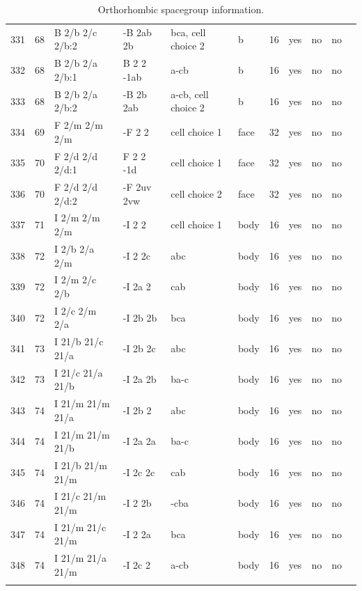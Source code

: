 \begin{center}
\begin{small}
\begin{longtable}{|l|l|l|l|l|l|l|l|l|l|l|}
331 &68 &B 2/b 2/c 2/b:2 &-B 2ab 2b &bca, cell choice 2 &b &16 &yes &no &no \\ 
332 &68 &B 2/b 2/a 2/b:1 &B 2 2 -1ab &a-cb &b &16 &yes &no &no \\ 
333 &68 &B 2/b 2/a 2/b:2 &-B 2b 2ab &a-cb, cell choice 2 &b &16 &yes &no &no \\ 
334 &69 &F 2/m 2/m 2/m &-F 2 2 &cell choice 1 &face &32 &yes &no &no \\ 
335 &70 &F 2/d 2/d 2/d:1 &F 2 2 -1d &cell choice 1 &face &32 &yes &no &no \\ 
336 &70 &F 2/d 2/d 2/d:2 &-F 2uv 2vw &cell choice 2 &face &32 &yes &no &no \\ 
337 &71 &I 2/m 2/m 2/m &-I 2 2 &cell choice 1 &body &16 &yes &no &no \\ 
338 &72 &I 2/b 2/a 2/m &-I 2 2c &abc &body &16 &yes &no &no \\ 
339 &72 &I 2/m 2/c 2/b &-I 2a 2 &cab &body &16 &yes &no &no \\ 
340 &72 &I 2/c 2/m 2/a &-I 2b 2b &bca &body &16 &yes &no &no \\ 
341 &73 &I 21/b 21/c 21/a &-I 2b 2c &abc &body &16 &yes &no &no \\ 
342 &73 &I 21/c 21/a 21/b &-I 2a 2b &ba-c &body &16 &yes &no &no \\ 
343 &74 &I 21/m 21/m 21/a &-I 2b 2 &abc &body &16 &yes &no &no \\ 
344 &74 &I 21/m 21/m 21/b &-I 2a 2a &ba-c &body &16 &yes &no &no \\ 
345 &74 &I 21/b 21/m 21/m &-I 2c 2c &cab &body &16 &yes &no &no \\ 
346 &74 &I 21/c 21/m 21/m &-I 2 2b &-cba &body &16 &yes &no &no \\ 
347 &74 &I 21/m 21/c 21/m &-I 2 2a &bca &body &16 &yes &no &no \\ 
348 &74 &I 21/m 21/a 21/m &-I 2c 2 &a-cb &body &16 &yes &no &no \\ 
\hline
\caption{Orthorhombic spacegroup information.}
\end{longtable}


\end{small}
\end{center}
